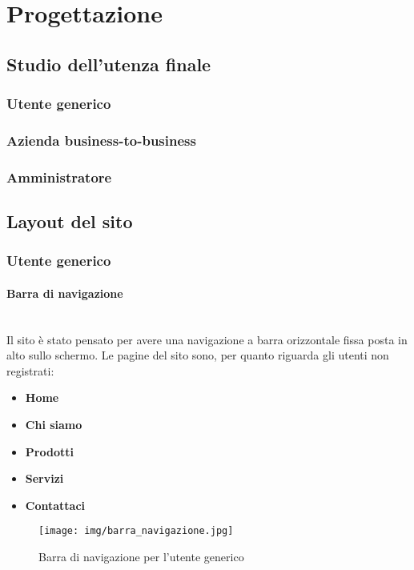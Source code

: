 \newpage
\section{Progettazione}
\subsection{Studio dell'utenza finale}
\subsubsection{Utente generico}

\subsubsection{Azienda business-to-business}

\subsubsection{Amministratore}


\subsection{Layout del sito}

\subsubsection{Utente generico}

\paragraph{Barra di navigazione}
~\\Il sito è stato pensato per avere una navigazione a barra orizzontale fissa posta in alto sullo schermo. Le pagine del sito sono, per quanto riguarda gli utenti non registrati:
\begin{itemize}
	\item \textbf{Home}
	\item \textbf{Chi siamo}
	\item \textbf{Prodotti}
	\item \textbf{Servizi}
	\item \textbf{Contattaci}
\end{itemize}

\begin{figure}[h!]
	\centerline{\texttt{[image: img/barra\_navigazione.jpg]}}
	\caption{Barra di navigazione per l'utente generico}
	\label{fig:navbarGU}
\end{figure}
~\\

